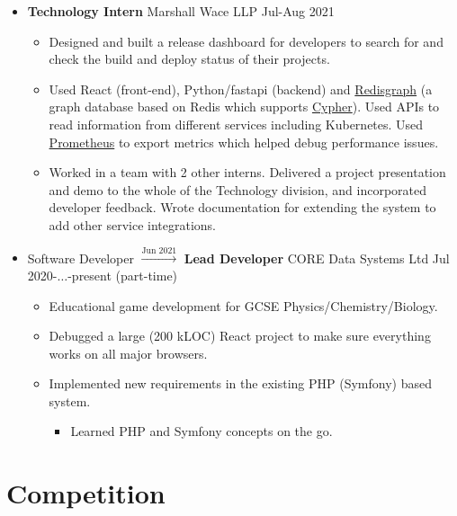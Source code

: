   \begin{itemize}
    \item \textbf{Technology Intern} \dashdiv{} Marshall Wace LLP \dashdiv{} Jul-Aug 2021

    \begin{itemize}
      \item Designed and built a release dashboard for developers to search for and check the build and deploy status of their projects.
      \item Used React (front-end), Python/fastapi (backend) and \href{https://oss.redis.com/redisgraph/}{\color{link}Redisgraph} (a graph database based on Redis which supports \href{https://neo4j.com/developer/cypher/}{\color{link}Cypher}). Used APIs to read information from different services including Kubernetes. Used \href{https://prometheus.io/}{\color{link}Prometheus} to export metrics which helped debug performance issues.
      \item Worked in a team with 2 other interns. Delivered a project presentation and demo to the whole of the Technology division, and incorporated developer feedback. Wrote documentation for extending the system to add other service integrations.
    \end{itemize}

    \item Software Developer $\xrightarrow{\text{Jun 2021}}$ \textbf{Lead Developer} \dashdiv{} CORE Data Systems Ltd \dashdiv{} Jul 2020-$\ldots$-present (part-time)

    \begin{itemize}
      \item Educational game development for GCSE Physics/Chemistry/Biology.
      \item Debugged a large (200 kLOC) React project to make sure everything works on all major browsers.
      \item Implemented new requirements in the existing PHP (Symfony) based system.
      \begin{itemize}
        \item Learned PHP and Symfony concepts on the go.
      \end{itemize}
    \end{itemize}
  \end{itemize}

  \section{Competition}

